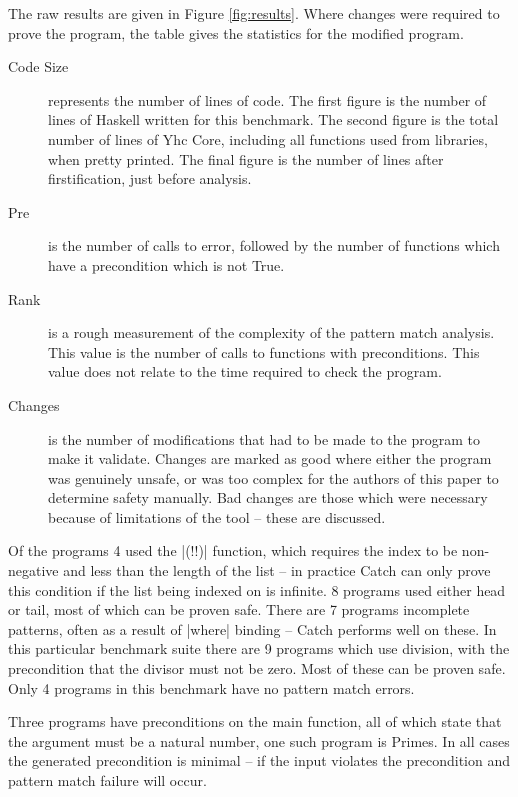 \documentclass[preprint]{sigplanconf}
\newcommand{\C}[1]{\textsf{#1}}
\begin{document}
The raw results are given in Figure \ref{fig:results}. Where changes were required to prove the program, the table gives the statistics for the modified program.

\begin{description}
\item[Code Size] represents the number of lines of code. The first figure is the number of lines of Haskell written for this benchmark. The second figure is the total number of lines of Yhc Core, including all functions used from libraries, when pretty printed. The final figure is the number of lines after firstification, just before analysis.

\item[Pre] is the number of calls to error, followed by the number of functions which have a precondition which is not True.

\item[Rank] is a rough measurement of the complexity of the pattern match analysis. This value is the number of calls to functions with preconditions. This value does not relate to the time required to check the program.

\item[Changes] is the number of modifications that had to be made to the program to make it validate. Changes are marked as good where either the program was genuinely unsafe, or was too complex for the authors of this paper to determine safety manually. Bad changes are those which were necessary because of limitations of the tool -- these are discussed.
\end{description}

Of the programs 4 used the |(!!)| function, which requires the index to be non-negative and less than the length of the list -- in practice Catch can only prove this condition if the list being indexed on is infinite. 8 programs used either \C{head} or \C{tail}, most of which can be proven safe. There are 7 programs incomplete patterns, often as a result of |where| binding -- Catch performs well on these. In this particular benchmark suite there are 9 programs which use division, with the precondition that the divisor must not be zero. Most of these can be proven safe. Only 4 programs in this benchmark have no pattern match errors.

Three programs have preconditions on the \C{main} function, all of which state that the argument must be a natural number, one such program is Primes. In all cases the generated precondition is minimal -- if the input violates the precondition and pattern match failure will occur.
\end{document}
